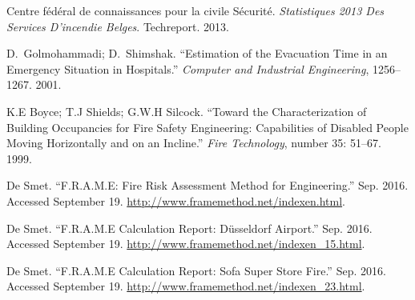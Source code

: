 \documentclass{style/llncs}
\begin{document}
{\begin{thebibliography}{36}
Centre fédéral de connaissances pour la civile Sécurité. \emph{Statistiques 2013 Des Services D’incendie Belges}. Techreport. 2013.\label{1}%

D.~Golmohammadi; D.~Shimshak. \textquotedblleft{}Estimation of the Evacuation Time in an Emergency Situation in Hospitals.\textquotedblright{} \emph{Computer and Industrial Engineering}, 1256–1267. 2001.\label{17}%

K.E Boyce; T.J Shields; G.W.H Silcock. \textquotedblleft{}Toward the Characterization of Building Occupancies for Fire Safety Engineering: Capabilities of Disabled People Moving Horizontally and on an Incline.\textquotedblright{} \emph{Fire Technology}, number 35: 51–67. 1999.\label{36}%

De Smet. \textquotedblleft{}F.R.A.M.E: Fire Risk Assessment Method for Engineering.\textquotedblright{} Sep. 2016. Accessed September 19. \href{http://www.framemethod.net/indexen.html}{{\ttfamily http://\hspace{0pt}www.\hspace{0pt}framemethod.\hspace{0pt}net/\hspace{0pt}indexen.\hspace{0pt}html}}.\label{25}%

De Smet. \textquotedblleft{}F.R.A.M.E Calculation Report: Düsseldorf Airport.\textquotedblright{} Sep. 2016. Accessed September 19. \href{http://www.framemethod.net/indexen_15.html}{{\ttfamily http://\hspace{0pt}www.\hspace{0pt}framemethod.\hspace{0pt}net/\hspace{0pt}indexen\_\hspace{0pt}15.\hspace{0pt}html}}.\label{26}%

De Smet. \textquotedblleft{}F.R.A.M.E Calculation Report: Sofa Super Store Fire.\textquotedblright{} Sep. 2016. Accessed September 19. \href{http://www.framemethod.net/indexen_23.html}{{\ttfamily http://\hspace{0pt}www.\hspace{0pt}framemethod.\hspace{0pt}net/\hspace{0pt}indexen\_\hspace{0pt}23.\hspace{0pt}html}}.\label{27}%


\end{thebibliography}}
\end{document}

